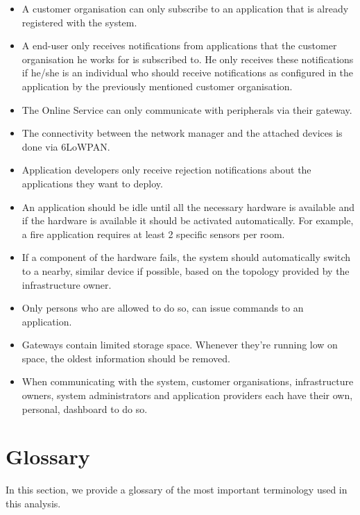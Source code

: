 \begin{itemize}
    \item A customer organisation can only subscribe to an application that is already registered with the system.
    \item A end-user only receives notifications from applications that the customer organisation he works for is subscribed to. He only receives these notifications if he/she is an individual who should receive notifications as configured in the application by the previously mentioned customer organisation.
    \item The Online Service can only communicate with peripherals via their gateway.
    \item The connectivity between the network manager and the attached devices is done via 6LoWPAN.
    \item Application developers only receive rejection notifications about the applications they want to deploy.
    \item An application should be idle until all the necessary hardware is available and if the hardware is available it should be activated automatically. For example, a fire application requires at least 2 specific sensors per room.
    \item If a component of the hardware fails, the system should automatically switch to a nearby, similar device if possible, based on the topology provided by the infrastructure owner.
    \item Only persons who are allowed to do so, can issue commands to an application.
    \item Gateways contain limited storage space. Whenever they're running low on space, the oldest information should be removed.
    \item When communicating with the system, customer organisations, infrastructure owners, system administrators and application providers each have their own, personal, dashboard to do so.
\end{itemize}

\section{Glossary}
In this section, we provide a glossary of the most important terminology used
in this analysis.

